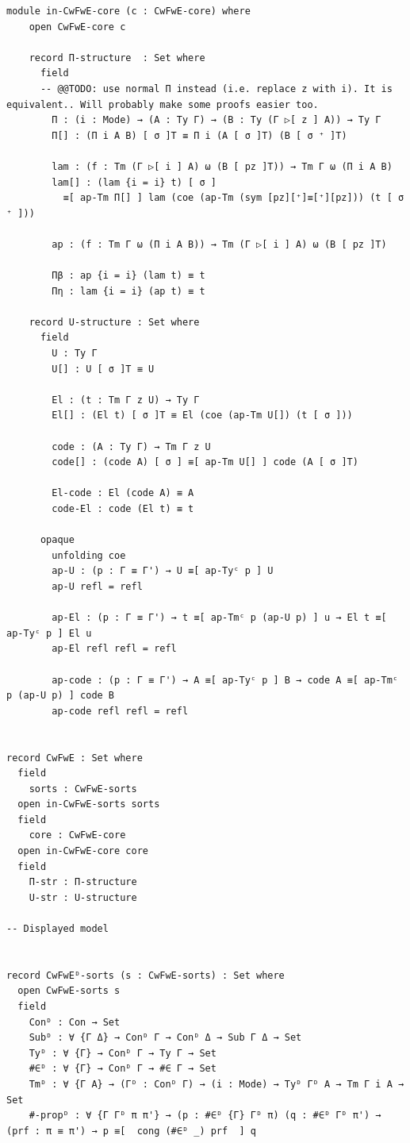 \documentclass[10pt,a4paper]{article}
\theoremstyle{definition}
\theoremstyle{remark}
\begin{document}
{\begin{Verbatim}[breaklines=true,breakanywhere=true,fontsize=\scriptsize]
  module in-CwFwE-core (c : CwFwE-core) where
    open CwFwE-core c

    record Π-structure  : Set where
      field
      -- @@TODO: use normal Π instead (i.e. replace z with i). It is equivalent.. Will probably make some proofs easier too.
        Π : (i : Mode) → (A : Ty Γ) → (B : Ty (Γ ▷[ z ] A)) → Ty Γ
        Π[] : (Π i A B) [ σ ]T ≡ Π i (A [ σ ]T) (B [ σ ⁺ ]T)

        lam : (f : Tm (Γ ▷[ i ] A) ω (B [ pz ]T)) → Tm Γ ω (Π i A B)
        lam[] : (lam {i = i} t) [ σ ]
          ≡[ ap-Tm Π[] ] lam (coe (ap-Tm (sym [pz][⁺]≡[⁺][pz])) (t [ σ ⁺ ]))

        ap : (f : Tm Γ ω (Π i A B)) → Tm (Γ ▷[ i ] A) ω (B [ pz ]T)

        Πβ : ap {i = i} (lam t) ≡ t
        Πη : lam {i = i} (ap t) ≡ t

    record U-structure : Set where
      field
        U : Ty Γ
        U[] : U [ σ ]T ≡ U

        El : (t : Tm Γ z U) → Ty Γ
        El[] : (El t) [ σ ]T ≡ El (coe (ap-Tm U[]) (t [ σ ]))

        code : (A : Ty Γ) → Tm Γ z U
        code[] : (code A) [ σ ] ≡[ ap-Tm U[] ] code (A [ σ ]T)

        El-code : El (code A) ≡ A
        code-El : code (El t) ≡ t

      opaque
        unfolding coe
        ap-U : (p : Γ ≡ Γ') → U ≡[ ap-Tyᶜ p ] U
        ap-U refl = refl

        ap-El : (p : Γ ≡ Γ') → t ≡[ ap-Tmᶜ p (ap-U p) ] u → El t ≡[ ap-Tyᶜ p ] El u
        ap-El refl refl = refl

        ap-code : (p : Γ ≡ Γ') → A ≡[ ap-Tyᶜ p ] B → code A ≡[ ap-Tmᶜ p (ap-U p) ] code B
        ap-code refl refl = refl


record CwFwE : Set where
  field
    sorts : CwFwE-sorts
  open in-CwFwE-sorts sorts
  field
    core : CwFwE-core
  open in-CwFwE-core core
  field
    Π-str : Π-structure
    U-str : U-structure

-- Displayed model

    
record CwFwEᴰ-sorts (s : CwFwE-sorts) : Set where
  open CwFwE-sorts s
  field
    Conᴰ : Con → Set
    Subᴰ : ∀ {Γ Δ} → Conᴰ Γ → Conᴰ Δ → Sub Γ Δ → Set
    Tyᴰ : ∀ {Γ} → Conᴰ Γ → Ty Γ → Set
    #∈ᴰ : ∀ {Γ} → Conᴰ Γ → #∈ Γ → Set
    Tmᴰ : ∀ {Γ A} → (Γᴰ : Conᴰ Γ) → (i : Mode) → Tyᴰ Γᴰ A → Tm Γ i A → Set
    #-propᴰ : ∀ {Γ Γᴰ π π'} → (p : #∈ᴰ {Γ} Γᴰ π) (q : #∈ᴰ Γᴰ π') → (prf : π ≡ π') → p ≡[  cong (#∈ᴰ _) prf  ] q


\end{Verbatim}}
\end{document}
